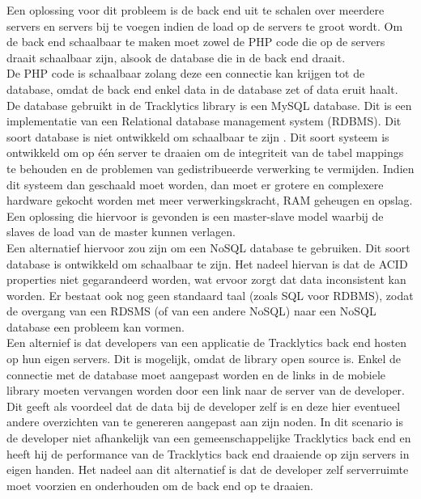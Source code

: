 Een oplossing voor dit probleem is de back end uit te schalen over meerdere servers en servers bij te voegen indien de load op de servers te groot wordt. Om de back end schaalbaar te maken moet zowel de PHP code die op de servers draait schaalbaar zijn, alsook de database die in de back end draait. \\
De PHP code is schaalbaar zolang deze een connectie kan krijgen tot de database, omdat de back end enkel data in de database zet of data eruit haalt. \\

De database gebruikt in de Tracklytics library is een MySQL database. Dit is een implementatie van een Relational database management system (RDBMS). Dit soort database is niet ontwikkeld om schaalbaar te zijn \cite{RDBMS}. Dit soort systeem is ontwikkeld om op \'e\'en server te draaien om de integriteit van de tabel mappings te behouden en de problemen van gedistribueerde verwerking te vermijden. Indien dit systeem dan geschaald moet worden, dan moet er grotere en complexere hardware gekocht worden met meer verwerkingskracht, RAM geheugen en opslag. Een oplossing die hiervoor is gevonden is een master-slave model waarbij de slaves de load van de master kunnen verlagen. \\
Een alternatief hiervoor zou zijn om een NoSQL database te gebruiken. Dit soort database is ontwikkeld om schaalbaar te zijn. Het nadeel hiervan is dat de ACID properties niet gegarandeerd worden, wat ervoor zorgt dat data inconsistent kan worden. Er bestaat ook nog geen standaard taal (zoals SQL voor RDBMS), zodat de overgang van een RDSMS (of van een andere NoSQL) naar een NoSQL database een probleem kan vormen. \\


Een alternief is dat developers van een applicatie de Tracklytics back end hosten op hun eigen servers. Dit is mogelijk, omdat de library open source is. Enkel de connectie met de database moet aangepast worden en de links in de mobiele library moeten vervangen worden door een link naar de server van de developer. Dit geeft als voordeel dat de data bij de developer zelf is en deze hier eventueel andere overzichten van te genereren aangepast aan zijn noden. In dit scenario is de developer niet afhankelijk van een gemeenschappelijke Tracklytics back end en heeft hij de performance van de Tracklytics back end draaiende op zijn servers in eigen handen. Het nadeel aan dit alternatief is dat de developer zelf serverruimte moet voorzien en onderhouden om de back end op te draaien. \\


